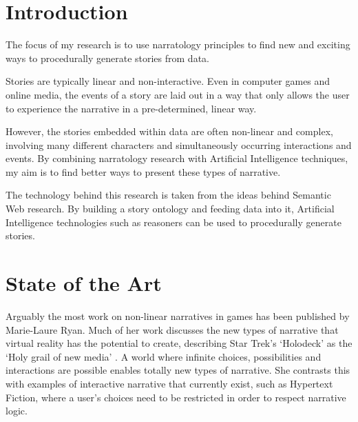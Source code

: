 \documentclass{llncs}
\begin{document}
\section{Introduction} %

The focus of my research is to use narratology principles to find new and exciting ways to procedurally generate stories from data.

Stories are typically linear and non-interactive. Even in computer games and online media, the events of a story are laid out in a way that only allows the user to experience the narrative in a pre-determined, linear way.

However, the stories embedded within data are often non-linear and complex, involving many different characters and simultaneously occurring interactions and events. By combining narratology research with Artificial Intelligence techniques, my aim is to find better ways to present these types of narrative.

The technology behind this research is taken from the ideas behind Semantic Web research. By building a story ontology and feeding data into it, Artificial Intelligence technologies such as reasoners can be used to procedurally generate stories. 

\section{State of the Art}


Arguably the most work on non-linear narratives in games has been published by Marie-Laure Ryan. Much of her work discusses the new types of narrative that virtual reality has the potential to create, describing Star Trek's `Holodeck' as the `Holy grail of new media' \cite{Ryan2009}. A world where infinite choices, possibilities and interactions are possible enables totally new types of narrative. She contrasts this with examples of interactive narrative that currently exist, such as Hypertext Fiction, where a user's choices need to be restricted in order to respect narrative logic.
\end{document}
